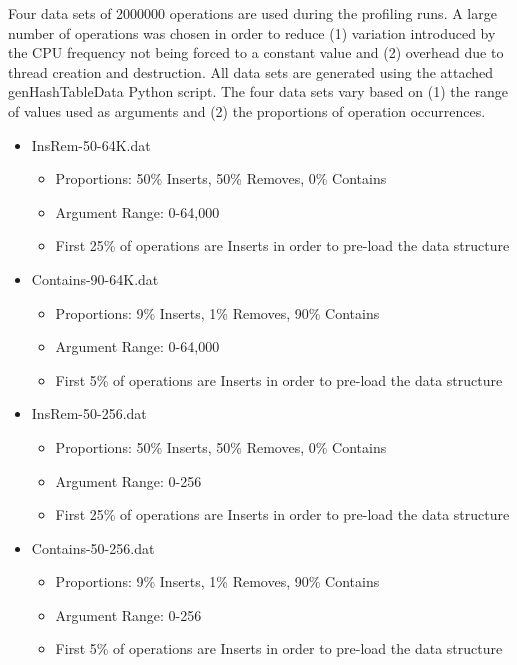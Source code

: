 \documentclass[11pt]{article} %
\begin{document}
Four data sets of 2000000 operations are used during the profiling runs. A large number of operations was chosen in order to reduce (1) variation introduced by the CPU frequency not being forced to a constant value and (2) overhead due to thread creation and destruction. All data sets are generated using the attached genHashTableData Python script. The four data sets vary based on (1) the range of values used as arguments and (2) the proportions of operation occurrences.

\begin{itemize}
	\item InsRem-50-64K.dat
	\begin{itemize}
		\item Proportions: 50\% Inserts, 50\% Removes, 0\% Contains
		\item Argument Range: 0-64,000 
           \item First 25\% of operations are Inserts in order to pre-load the data structure 
	\end{itemize}
	\item Contains-90-64K.dat
	\begin{itemize}
		\item Proportions: 9\% Inserts, 1\% Removes, 90\% Contains
		\item Argument Range: 0-64,000 
           \item First 5\% of operations are Inserts in order to pre-load the data structure 
	\end{itemize}
	\item InsRem-50-256.dat
	\begin{itemize}
		\item Proportions: 50\% Inserts, 50\% Removes, 0\% Contains
		\item Argument Range: 0-256
           \item First 25\% of operations are Inserts in order to pre-load the data structure  
	\end{itemize}
	\item Contains-50-256.dat
	\begin{itemize}
		\item Proportions: 9\% Inserts, 1\% Removes, 90\% Contains
		\item Argument Range: 0-256
           \item First 5\% of operations are Inserts in order to pre-load the data structure  
	\end{itemize}
\end{itemize}
\end{document}
